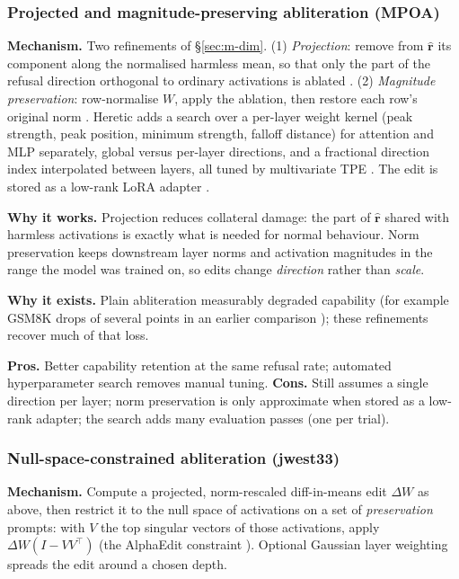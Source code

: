 \subsubsection{Projected and magnitude-preserving abliteration (MPOA)}
\label{sec:m-mpoa}
\textbf{Mechanism.} Two refinements of \S\ref{sec:m-dim}.
(1) \emph{Projection}: remove from $\hat{\mathbf{r}}$ its component along the
normalised harmless mean, so that only the part of the refusal direction
orthogonal to ordinary activations is ablated \cite{lai2024projected}.
(2) \emph{Magnitude preservation}: row-normalise $W$, apply the ablation, then
restore each row's original norm \cite{lai2025mpoa}.
Heretic adds a search over a per-layer weight kernel (peak strength, peak
position, minimum strength, falloff distance) for attention and MLP separately,
global versus per-layer directions, and a fractional direction index
interpolated between layers, all tuned by multivariate TPE
\cite{akiba2019optuna,heretic2025}. The edit is stored as a low-rank LoRA
adapter \cite{hu2022lora}.

\textbf{Why it works.} Projection reduces collateral damage: the part of
$\hat{\mathbf{r}}$ shared with harmless activations is exactly what is
needed for normal behaviour. Norm preservation keeps downstream layer norms and
activation magnitudes in the range the model was trained on, so edits
change \emph{direction} rather than \emph{scale}.

\textbf{Why it exists.} Plain abliteration measurably degraded capability
(for example GSM8K drops of several points in an earlier comparison
\cite{young2025comparative}); these refinements recover much of that loss.

\textbf{Pros.} Better capability retention at the same refusal rate;
automated hyperparameter search removes manual tuning.
\textbf{Cons.} Still assumes a single direction per layer; norm preservation is
only approximate when stored as a low-rank adapter; the search adds many
evaluation passes (one per trial).

\subsubsection{Null-space-constrained abliteration (jwest33)}
\label{sec:m-null}
\textbf{Mechanism.} Compute a projected, norm-rescaled diff-in-means edit
$\Delta W$ as above, then restrict it to the null space of activations on a
set of \emph{preservation} prompts: with $V$ the top singular vectors of
those activations, apply $\Delta W (I - V V^{\top})$
(the AlphaEdit constraint \cite{fang2025alphaedit}). Optional Gaussian layer
weighting spreads the edit around a chosen depth.

